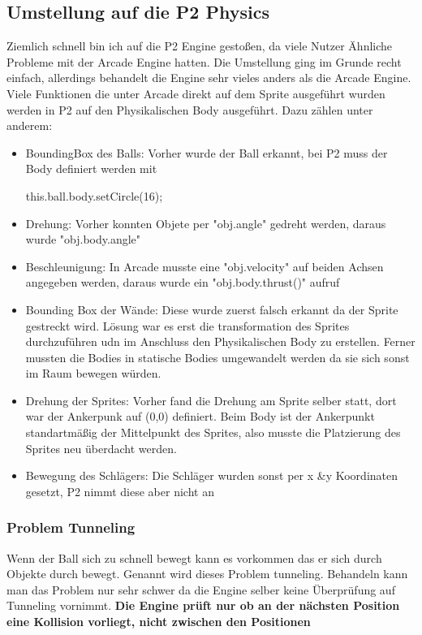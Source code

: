 \subsection{Umstellung auf die P2 Physics}
Ziemlich schnell bin ich auf die P2 Engine gestoßen, da viele Nutzer Ähnliche Probleme mit der Arcade Engine hatten.
\newline
Die Umstellung ging im Grunde recht einfach, allerdings behandelt die Engine sehr vieles anders als die Arcade Engine.
\newline
Viele Funktionen die unter Arcade direkt auf dem Sprite ausgeführt wurden werden in P2 auf den Physikalischen Body ausgeführt. Dazu zählen unter anderem:
\begin{itemize}
\item
BoundingBox des Balls: Vorher wurde der Ball erkannt, bei P2 muss der Body definiert werden mit 
\begin{listing}
this.ball.body.setCircle(16);
\end{listing}
\item
Drehung: Vorher konnten Objete per "obj.angle" gedreht werden, daraus wurde "obj.body.angle"
\item
Beschleunigung: In Arcade musste eine "obj.velocity" auf beiden Achsen angegeben werden, daraus wurde ein "obj.body.thrust()" aufruf
\item
Bounding Box der Wände: Diese wurde zuerst falsch erkannt da der Sprite gestreckt wird.
Lösung war es erst die transformation des Sprites durchzuführen udn im Anschluss den Physikalischen Body zu erstellen.
Ferner mussten die Bodies in statische Bodies umgewandelt werden da sie sich sonst im Raum bewegen würden.
\item
Drehung der Sprites: Vorher fand die Drehung am Sprite selber statt, dort war der Ankerpunk auf (0,0) definiert. Beim Body ist der Ankerpunkt standartmäßig der Mittelpunkt des Sprites, also musste die Platzierung des Sprites neu überdacht werden.
\item
Bewegung des Schlägers: Die Schläger wurden sonst per x &y Koordinaten gesetzt, P2 nimmt diese aber nicht an
\end{itemize}
\subsubsection{Problem Tunneling}
Wenn der Ball sich zu schnell bewegt kann es vorkommen das er sich durch Objekte durch bewegt. Genannt wird dieses Problem tunneling.
Behandeln kann man das Problem nur sehr schwer da die Engine selber keine Überprüfung auf Tunneling vornimmt.
\newline
\textbf{Die Engine prüft nur ob an der nächsten Position eine Kollision vorliegt, nicht zwischen den Positionen}
